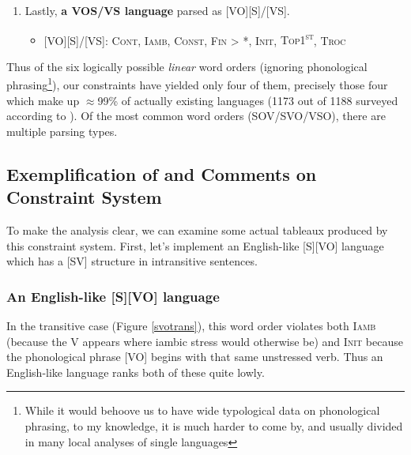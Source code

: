 \documentclass{article}
\newcommand{\cont}{\textsc{Cont}}
\newcommand{\iamb}{\textsc{Iamb}}
\newcommand{\cons}{\textsc{Const}}
\newcommand{\topf}{\textsc{Top1\textsuperscript{st}}}
\newcommand{\nophi}{\textsc{*\textphi}}
\newcommand{\finphi}{\textsc{Fin\textphi}}
\newcommand{\initphi}{\textsc{Init\textphi}}
\newcommand{\troc}{\textsc{Troc}}
\begin{document}
\begin{enumerate}
\begin{itemize}
\item {}[VS][O]/[VS]: \cont, \iamb, \finphi, {\topf} {\textgreater} \cons, \nophi, \initphi, \troc
\item {}[VSO]/[VS]: \iamb, \cons, \nophi, \finphi, {\topf} {\textgreater} \cont, \initphi, \troc
\end{itemize}

\item Lastly, \textbf{a VOS/VS language} parsed as [VO][S]/[VS].

\begin{itemize}
\item {}[VO][S]/[VS]: \cont, \iamb, \cons, {\finphi} {\textgreater} \nophi, \initphi, \topf, \troc
\end{itemize}

\end{enumerate}

Thus of the six logically possible \emph{linear} word orders (ignoring phonological phrasing\footnote{While it would behoove us to have wide typological data on phonological phrasing, to my knowledge, it is much harder to come by, and usually divided in many local analyses of single languages}), our constraints have yielded only four of them, precisely those four which make up $\approx$99\% of actually existing languages (1173 out of 1188 surveyed according to \textcite{dryer13}).
Of the most common word orders (SOV/SVO/VSO), there are multiple parsing types.


\subsection{Exemplification of and Comments on Constraint System}

To make the analysis clear, we can examine some actual tableaux produced by this constraint system.
First, let's implement an English-like [S][VO] language which has a [SV] structure in intransitive sentences.

\subsubsection{An English-like [S][VO] language}

In the transitive case (Figure \ref{svotrans}), this word order violates both {\iamb} (because the V appears where iambic stress would otherwise be) and {\initphi} because the phonological phrase [VO] begins with that same unstressed verb.
Thus an English-like language ranks both of these quite lowly.
\end{document}
